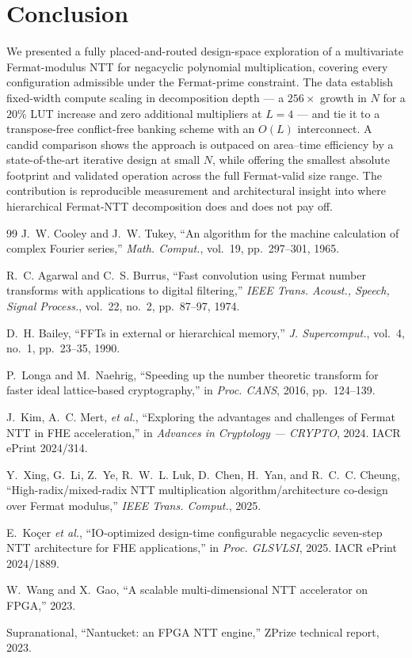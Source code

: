 \documentclass[conference]{IEEEtran}
\begin{document}
\section{Conclusion}\label{sec:concl}
We presented a fully placed-and-routed design-space exploration of a multivariate
Fermat-modulus NTT for negacyclic polynomial multiplication, covering every
configuration admissible under the Fermat-prime constraint. The data establish
fixed-width compute scaling in decomposition depth --- a $256\times$ growth in
$N$ for a $20\%$ LUT increase and zero additional multipliers at $L=4$ --- and tie
it to a transpose-free conflict-free banking scheme with an $O(L)$ interconnect.
A candid comparison shows the approach is outpaced on area--time efficiency by a
state-of-the-art iterative design at small $N$, while offering the smallest
absolute footprint and validated operation across the full Fermat-valid size
range. The contribution is reproducible measurement and architectural insight
into where hierarchical Fermat-NTT decomposition does and does not pay off.

\begin{thebibliography}{99}
 J.~W. Cooley and J.~W. Tukey, ``An algorithm for the
machine calculation of complex Fourier series,'' \emph{Math. Comput.}, vol.~19,
pp.~297--301, 1965.

 R.~C. Agarwal and C.~S. Burrus, ``Fast convolution using
Fermat number transforms with applications to digital filtering,'' \emph{IEEE
Trans. Acoust., Speech, Signal Process.}, vol.~22, no.~2, pp.~87--97, 1974.

 D.~H. Bailey, ``FFTs in external or hierarchical memory,''
\emph{J. Supercomput.}, vol.~4, no.~1, pp.~23--35, 1990.

 P.~Longa and M.~Naehrig, ``Speeding up the number theoretic
transform for faster ideal lattice-based cryptography,'' in \emph{Proc. CANS},
2016, pp.~124--139.

 J.~Kim, A.~C. Mert, \emph{et al.}, ``Exploring the
advantages and challenges of Fermat NTT in FHE acceleration,'' in \emph{Advances
in Cryptology --- CRYPTO}, 2024. IACR ePrint 2024/314.

 Y.~Xing, G.~Li, Z.~Ye, R.~W.~L. Luk, D.~Chen, H.~Yan, and
R.~C.~C. Cheung, ``High-radix/mixed-radix NTT multiplication
algorithm/architecture co-design over Fermat modulus,'' \emph{IEEE Trans.
Comput.}, 2025.

 E.~Ko\c{c}er \emph{et al.}, ``IO-optimized design-time
configurable negacyclic seven-step NTT architecture for FHE applications,'' in
\emph{Proc. GLSVLSI}, 2025. IACR ePrint 2024/1889.

 W.~Wang and X.~Gao, ``A scalable multi-dimensional NTT
accelerator on FPGA,'' 2023.

 Supranational, ``Nantucket: an FPGA NTT engine,''
ZPrize technical report, 2023.
\end{thebibliography}
\end{document}
